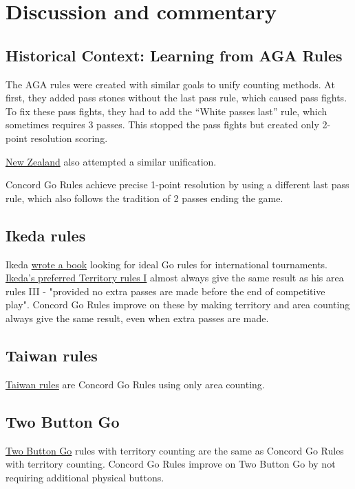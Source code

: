 \documentclass[11pt]{article}
\begin{document}
\newpage

\section*{Discussion and commentary}

\subsection*{Historical Context: Learning from AGA Rules}

The AGA rules were created with similar goals to unify counting methods.
At first, they added pass stones without the last pass rule, which caused pass fights.
To fix these pass fights, they had to add the ``White passes last'' rule, which sometimes requires 3 passes.
This stopped the pass fights but created only 2-point resolution scoring.

\href{https://go.org.nz/index.php/about-go/history-of-nz-rules-of-go}{New Zealand} also attempted a similar unification.

Concord Go Rules achieve precise 1-point resolution by using a different last pass rule, which also follows the tradition of 2 passes ending the game.

\subsection*{Ikeda rules}
Ikeda \href{https://gobase.org/studying/rules/ikeda/}{wrote a book} looking for ideal Go rules for international tournaments.
\href{https://gobase.org/studying/rules/ikeda/?sec=e_rules}{Ikeda's preferred Territory rules I} almost always give the same result as his area rules III
- "provided no extra passes are made before the end of competitive play".
Concord Go Rules improve on these by making territory and area counting always give the same result, even when extra passes are made.

\subsection*{Taiwan rules}
\href{https://senseis.xmp.net/?TaiwanRules}{Taiwan rules} are Concord Go Rules using only area counting.

\subsection*{Two Button Go}
\href{https://senseis.xmp.net/?TwoButtonGo}{Two Button Go} rules with territory counting are the same as Concord Go Rules with territory counting.
Concord Go Rules improve on Two Button Go by not requiring additional physical buttons.
\end{document}

